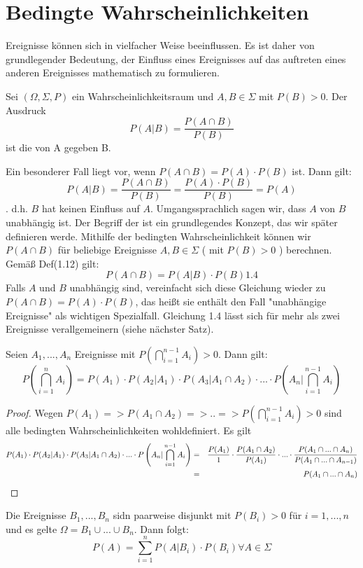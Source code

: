 \section{Bedingte Wahrscheinlichkeiten}
Ereignisse können sich in vielfacher Weise beeinflussen. Es ist daher von grundlegender Bedeutung, der Einfluss eines %
Ereignisses auf das auftreten eines anderen Ereignisses mathematisch zu formulieren.
\begin{definition}
Sei $(\Omega,\Sigma,P)$ ein Wahrscheinlichkeitsraum und $A,B \in \Sigma$ mit $P(B) > 0$. Der Ausdruck
$$ P(A|B) = \frac{P(A\cap B)}{P(B)} $$
ist die  von A gegeben B.
\end{definition}
Ein besonderer Fall liegt vor, wenn $P(A \cap B)=P(A) \cdot P(B)$ ist. Dann gilt:
$$ P(A|B) = \frac{P(A\cap B)}{P(B)} = \frac{P(A) \cdot P(B)}{P(B)} = P(A) $$.
d.h. $B$ hat keinen Einfluss auf $A$. Umgangssprachlich sagen wir, dass $A$ von $B$ unabhängig ist. Der Begriff der %
 ist ein grundlegendes Konzept, das wir später definieren werde.
Mithilfe der bedingten Wahrscheinlichkeit können wir $P(A \cap B)$ für beliebige Ereignisse $A,B \in \Sigma$ %
( mit $P(B) > 0$ ) berechnen. Gemäß Def(1.12) gilt:
$$ P(A \cap B) = P( A|B ) \cdot P(B) \text{1.4} $$
Falls $A$ und $B$ unabhängig sind, vereinfacht sich diese Gleichung wieder zu $P(A \cap B) = P(A) \cdot P(B)$, %
das heißt sie enthält den Fall "unabhängige Ereignisse" als wichtigen Spezialfall. Gleichung 1.4 lässt sich für mehr %
als zwei Ereignisse verallgemeinern (siehe nächster Satz).
\begin{proposition}[Multiplikationssatz]
Seien $A_1,...,A_n$ Ereignisse mit $P \left ( \bigcap\limits_{i=1}^{n-1} A_i \right ) > 0$. Dann gilt:
$$ P \left ( \bigcap\limits_{i=1}^{n} A_i \right ) = P(A_1) \cdot P(A_2 | A_1) \cdot P(A_3 | A_1 \cap A_2 ) \cdot ... \cdot P \left ( A_n | \bigcap\limits_{i=1}^{n-1} A_i \right ) $$
\end{proposition}
\begin{proof}
Wegen $P(A_1) => P( A_1 \cap A_2 ) => .. =>  P \left ( \bigcap\limits_{i=1}^{n-1} A_i \right ) > 0$ sind alle bedingten %
Wahrscheinlichkeiten wohldefiniert. Es gilt 
\begin{eqnarray*}
P(A_1) \cdot P(A_2 | A_1) \cdot P(A_3 | A_1 \cap A_2 ) \cdot ... \cdot P \left ( A_n | \bigcap\limits_{i=1}^{n-1} A_i \right ) & = & \frac{P(A_1)}{1} \cdot \frac{P(A_1 \cap A_2)}{P(A_1)} \cdot ... \cdot \frac{P(A_1 \cap ... \cap A_n)}{P(A_1 \cap ... \cap A_{n-1})}
\cr & = & P(A_1 \cap ... \cap A_n)
\end{eqnarray*}
\end{proof}
\begin{theorem}
Die Ereignisse $B_1,...,B_n$ sidn paarweise disjunkt mit $P(B_i) > 0$ für $i=1,...,n$ und es gelte $\Omega = B_1 \cup ... \cup B_n$. %
Dann folgt:
$$ P(A) = \sum\limits_{i=1}^{n} P(A|B_i) \cdot P(B_i) \forall A \in \Sigma$$
\end{theorem}
